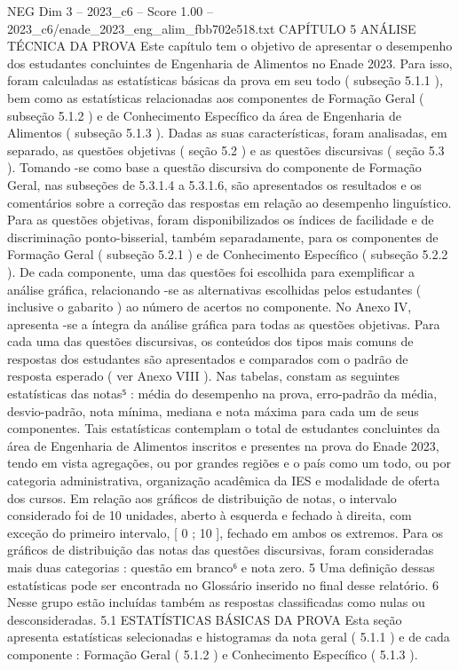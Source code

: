 \begin{textsample}{NEG Dim 3 – 2023\_c6 – Score 1.00 – 2023\_c6/enade\_2023\_eng\_alim\_fbb702e518.txt}  \label{ex:f3_neg_182}
CAPÍTULO 5 ANÁLISE TÉCNICA DA PROVA Este capítulo tem o objetivo de apresentar o desempenho dos estudantes concluintes de Engenharia de Alimentos no Enade 2023.
Para isso, foram calculadas as estatísticas básicas da prova em seu todo ( subseção 5.1.1 ), bem como as estatísticas relacionadas aos componentes de Formação Geral ( subseção 5.1.2 ) e de Conhecimento Específico da área de Engenharia de Alimentos ( subseção 5.1.3 ).
Dadas as suas características, foram analisadas, em separado, as questões objetivas ( seção 5.2 ) e as questões discursivas ( seção 5.3 ).
Tomando -se como base a questão discursiva do componente de Formação Geral, nas subseções de 5.3.1.4 a 5.3.1.6, são apresentados os resultados e os comentários sobre a correção das respostas em relação ao desempenho linguístico.
Para as questões objetivas, foram disponibilizados os índices de facilidade e de discriminação ponto-bisserial, também separadamente, para os componentes de Formação Geral ( subseção 5.2.1 ) e de Conhecimento Específico ( subseção 5.2.2 ).
De cada componente, uma das questões foi escolhida para exemplificar a análise gráfica, relacionando -se as alternativas escolhidas pelos estudantes ( inclusive o gabarito ) ao número de acertos no componente.
No Anexo IV, apresenta -se a íntegra da análise gráfica para todas as questões objetivas.
Para cada uma das questões discursivas, os conteúdos dos tipos mais comuns de respostas dos estudantes são apresentados e comparados com o padrão de resposta esperado ( ver Anexo VIII ).
Nas tabelas, constam as seguintes estatísticas das notas⁵ : média do desempenho na prova, erro-padrão da média, desvio-padrão, nota mínima, mediana e nota máxima para cada um de seus componentes.
Tais estatísticas contemplam o total de estudantes concluintes da área de Engenharia de Alimentos inscritos e presentes na prova do Enade 2023, tendo em vista agregações, ou por grandes regiões e o país como um todo, ou por categoria administrativa, organização acadêmica da IES e modalidade de oferta dos cursos.
Em relação aos gráficos de distribuição de notas, o intervalo considerado foi de 10 unidades, aberto à esquerda e fechado à direita, com exceção do primeiro intervalo, [ 0 ; 10 ], fechado em ambos os extremos.
Para os gráficos de distribuição das notas das questões discursivas, foram consideradas mais duas categorias : questão em branco⁶ e nota zero. 5 Uma definição dessas estatísticas pode ser encontrada no Glossário inserido no final desse relatório. 6 Nesse grupo estão incluídas também as respostas classificadas como nulas ou desconsideradas. 5.1 ESTATÍSTICAS BÁSICAS DA PROVA Esta seção apresenta estatísticas selecionadas e histogramas da nota geral ( 5.1.1 ) e de cada componente : Formação Geral ( 5.1.2 ) e Conhecimento Específico ( 5.1.3 ).

\end{textsample}
